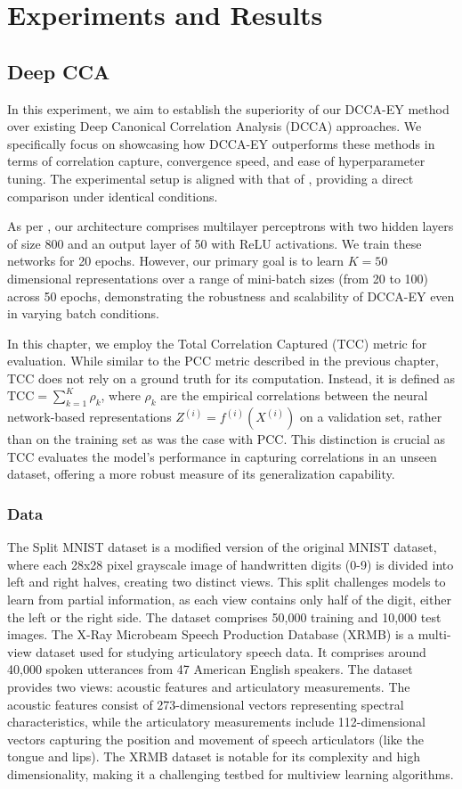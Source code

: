 \section{Experiments and Results}

\subsection{Deep CCA}\label{sec:experiments-DCCA}
In this experiment, we aim to establish the superiority of our DCCA-EY method over existing Deep Canonical Correlation Analysis (DCCA) approaches.
We specifically focus on showcasing how DCCA-EY outperforms these methods in terms of correlation capture, convergence speed, and ease of hyperparameter tuning.
The experimental setup is aligned with that of \citet{wang2015stochastic}, providing a direct comparison under identical conditions.

As per \citet{wang2015stochastic}, our architecture comprises multilayer perceptrons with two hidden layers of size 800 and an output layer of 50 with ReLU activations.
We train these networks for 20 epochs.
However, our primary goal is to learn $K=50$ dimensional representations over a range of mini-batch sizes (from 20 to 100) across 50 epochs, demonstrating the robustness and scalability of DCCA-EY even in varying batch conditions.

In this chapter, we employ the Total Correlation Captured (TCC) metric for evaluation.
While similar to the PCC metric described in the previous chapter, TCC does not rely on a ground truth for its computation.
Instead, it is defined as \( \text{TCC} = \sum_{k=1}^K \rho_k \), where $\rho_k$ are the empirical correlations between the neural network-based representations $Z^{(i)} = f^{(i)}(X^{(i)})$ on a validation set, rather than on the training set as was the case with PCC. This distinction is crucial as TCC evaluates the model's performance in capturing correlations in an unseen dataset, offering a more robust measure of its generalization capability.
\subsubsection{Data}
The Split MNIST dataset is a modified version of the original MNIST dataset, where each 28x28 pixel grayscale image of handwritten digits (0-9) is divided into left and right halves, creating two distinct views.
This split challenges models to learn from partial information, as each view contains only half of the digit, either the left or the right side.
The dataset comprises 50,000 training and 10,000 test images.
The X-Ray Microbeam Speech Production Database (XRMB) is a multi-view dataset used for studying articulatory speech data.
It comprises around 40,000 spoken utterances from 47 American English speakers.
The dataset provides two views: acoustic features and articulatory measurements.
The acoustic features consist of 273-dimensional vectors representing spectral characteristics, while the articulatory measurements include 112-dimensional vectors capturing the position and movement of speech articulators (like the tongue and lips).
The XRMB dataset is notable for its complexity and high dimensionality, making it a challenging testbed for multiview learning algorithms.

